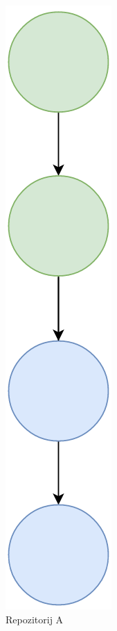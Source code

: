 \documentclass[times, utf8, diplomski, numeric]{fer}
\begin{document}
\begin{figure}[h!]
\begin{subfigure}{.24\textwidth}
\includegraphics[scale=0.4]{VersioningTreeB}
\caption{Repozitorij A}
\label{fig:VersioningTreeB}
\end{subfigure}
\begin{subfigure}{.24\textwidth}
\centering

\end{subfigure}
\end{figure}
\end{document}
